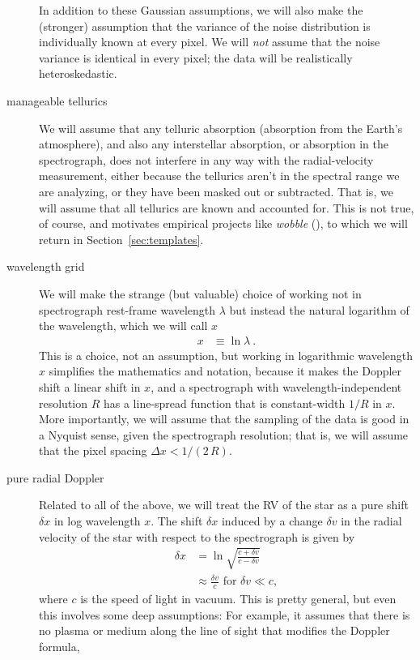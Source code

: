 \documentclass[modern]{aastex631}
\newcommand{\project}[1]{\textsl{#1}}
\newcommand{\wobble}{\project{wobble}}
\newcommand{\sectionname}{Section}
\newcommand{\secref}[1]{\sectionname~\ref{#1}}
\begin{document}
\begin{description}
    In addition to these Gaussian assumptions, we will also make the (stronger) assumption that the variance of the noise distribution is individually known at every pixel.
    We will \emph{not} assume that the noise variance is identical in every pixel; the data will be realistically heteroskedastic.
    \item[manageable tellurics]
    We will assume that any telluric absorption (absorption from the Earth's atmosphere), and also any interstellar absorption, or absorption in the spectrograph, does not interfere in any way with the radial-velocity measurement, either because the tellurics aren't in the spectral range we are analyzing, or they have been masked out or subtracted.
    That is, we will assume that all tellurics are known and accounted for.
    This is not true, of course, and motivates empirical projects like \wobble{} (\citealt{wobble}), to which we will return in \secref{sec:templates}.
    \item[wavelength grid] We will make the strange (but valuable) choice of working not in spectrograph rest-frame wavelength $\lambda$ but instead the natural logarithm of the wavelength, which we will call $x$
    \begin{align}
        x &\equiv \ln\lambda ~.
    \end{align}
    This is a choice, not an assumption, but working in logarithmic wavelength $x$ simplifies the mathematics and notation, because it makes the Doppler shift a linear shift in $x$, and a spectrograph with wavelength-independent resolution $R$ has a line-spread function that is constant-width $1/R$ in $x$.
    More importantly, we will assume that the sampling of the data is good in a Nyquist sense, given the spectrograph resolution; that is, we will assume that the pixel spacing $\Delta x<1/(2\,R)$.
    \item[pure radial Doppler] Related to all of the above, we will treat the RV of the star as a pure shift $\delta x$ in log wavelength $x$.
    The shift $\delta x$ induced by a change $\delta v$ in the radial velocity of the star with respect to the spectrograph is given by
    \begin{align}
        \delta x &= \ln\sqrt{\frac{c + \delta v}{c - \delta v}}\\
        &\approx \frac{\delta v}{c} \mbox{~for~} \delta v \ll c,
    \end{align}
    where $c$ is the speed of light in vacuum.
    This is pretty general, but even this involves some deep assumptions:
    For example, it assumes that there is no plasma or medium along the line of sight that modifies the Doppler formula,

\end{description}
\end{document}
